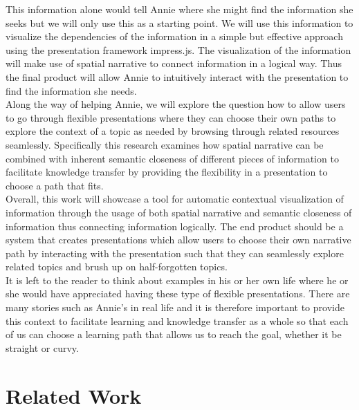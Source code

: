 \documentclass[twoside, 12pt]{article}
\begin{document}
This information alone would tell Annie where she might find the information she seeks but we will only use this as a starting point. We will use this information to visualize the dependencies of the information in a simple but effective approach using the presentation framework impress.js. The visualization of the information will make use of spatial narrative to connect information in a logical way. Thus the final product will allow Annie to intuitively interact with the presentation to find the information she needs.\\

Along the way of helping Annie, we will explore the question how to allow users to go through flexible presentations where they can choose their own paths to explore the context of a topic as needed by browsing through related resources seamlessly. Specifically this research examines how spatial narrative can be combined with inherent semantic closeness of different pieces of information to facilitate knowledge transfer by providing the flexibility in a presentation to choose a path that fits.\\

Overall, this work will showcase a tool for automatic contextual visualization of information through the usage of both spatial narrative and semantic closeness of information thus connecting information logically. The end product should be a system that creates presentations which allow users to choose their own narrative path by interacting with the presentation such that they can seamlessly explore related topics and brush up on half-forgotten topics.\\

It is left to the reader to think about examples in his or her own life where he or she would have appreciated having these type of flexible presentations. There are many stories such as Annie's in real life and it is therefore important to provide this context to facilitate learning and knowledge transfer as a whole so that each of us can choose a learning path that allows us to reach the goal, whether it be straight or curvy.\\

\section{Related Work}
\label{sec:relatedworks}
\end{document}
